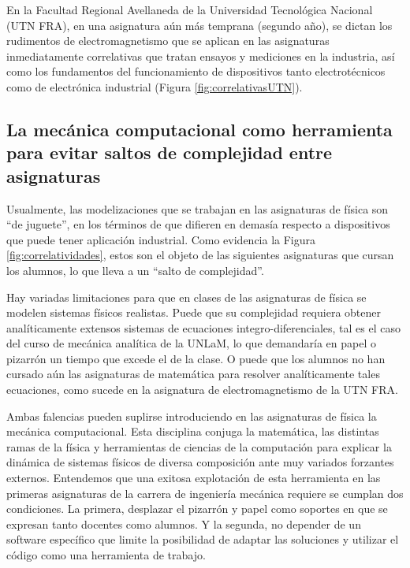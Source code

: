 \documentclass[a4paper]{fodami}        %
\begin{document}
En la Facultad Regional Avellaneda de la Universidad Tecnológica Nacional (UTN FRA), en una asignatura aún más temprana (segundo año), se dictan los rudimentos de electromagnetismo que se aplican en las asignaturas inmediatamente correlativas que tratan ensayos y mediciones en la industria, así como los fundamentos del funcionamiento de dispositivos tanto electrotécnicos como de electrónica industrial (Figura \ref{fig:correlativasUTN}).


\subsection{La mecánica computacional como herramienta para evitar saltos de complejidad entre asignaturas}

Usualmente, las modelizaciones que se trabajan en las asignaturas de física son ``de juguete'', en los términos de que difieren en demasía respecto a dispositivos que puede tener aplicación industrial.
Como evidencia la Figura \ref{fig:correlatividades}, estos son el objeto de las siguientes asignaturas que cursan los alumnos, lo que lleva a un ``salto de complejidad''. %

Hay variadas limitaciones para que en clases de las asignaturas de física se modelen sistemas físicos realistas.
Puede que su complejidad requiera obtener analíticamente extensos sistemas de ecuaciones integro-diferenciales, tal es el caso del curso de mecánica analítica de la UNLaM, lo que demandaría en papel o pizarrón un tiempo que excede el de la clase.
O puede que los alumnos no han cursado aún las asignaturas de matemática para resolver analíticamente tales ecuaciones, como sucede en la asignatura de electromagnetismo de la UTN FRA.

Ambas falencias pueden suplirse introduciendo en las asignaturas de física la mecánica computacional.
Esta disciplina conjuga la matemática, las distintas ramas de la física y herramientas de ciencias de la computación para explicar la dinámica de sistemas físicos de diversa composición ante muy variados forzantes externos.
Entendemos que una exitosa explotación de esta herramienta en las primeras asignaturas de la carrera de ingeniería mecánica requiere se cumplan dos condiciones.
La primera, desplazar el pizarrón y papel como soportes en que se expresan tanto docentes como alumnos.
Y la segunda, no depender de un software específico que limite la posibilidad de adaptar las soluciones y utilizar el código como una herramienta de trabajo. 
\end{document}
